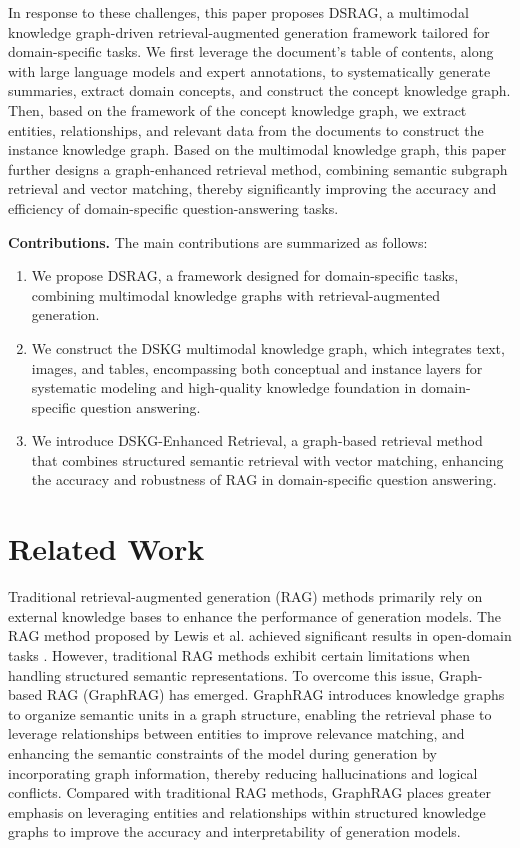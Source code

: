 \documentclass[runningheads]{llncs}
\begin{document}
	In response to these challenges, this paper proposes DSRAG, a multimodal knowledge graph-driven retrieval-augmented generation framework tailored for domain-specific tasks. We first leverage the document’s table of contents, along with large language models and expert annotations, to systematically generate summaries, extract domain concepts, and construct the concept knowledge graph. Then, based on the framework of the concept knowledge graph, we extract entities, relationships, and relevant data from the documents to construct the instance knowledge graph. Based on the multimodal knowledge graph, this paper further designs a graph-enhanced retrieval method, combining semantic subgraph retrieval and vector matching, thereby significantly improving the accuracy and efficiency of domain-specific question-answering tasks. 

\bigskip
\noindent\textbf{Contributions.} The main contributions are summarized as follows:

\begin{enumerate}
    \item We propose DSRAG, a framework designed for domain-specific tasks, combining multimodal knowledge graphs with retrieval-augmented generation.

    \item We construct the DSKG multimodal knowledge graph, which integrates text, images, and tables, encompassing both conceptual and instance layers for systematic modeling and high-quality knowledge foundation in domain-specific question answering.

    \item We introduce DSKG-Enhanced Retrieval, a graph-based retrieval method that combines structured semantic retrieval with vector matching, enhancing the accuracy and robustness of RAG in domain-specific question answering.
\end{enumerate}


    	\section{Related Work}\label{Work2}
	Traditional retrieval-augmented generation (RAG) methods primarily rely on external knowledge bases to enhance the performance of generation models. The RAG method proposed by Lewis et al. achieved significant results in open-domain tasks \cite{lewis2020retrieval}. However, traditional RAG methods exhibit certain limitations when handling structured semantic representations. To overcome this issue, Graph-based RAG (GraphRAG) has emerged. GraphRAG \cite{peng2024graph} introduces knowledge graphs to organize semantic units in a graph structure, enabling the retrieval phase to leverage relationships between entities to improve relevance matching, and enhancing the semantic constraints of the model during generation by incorporating graph information, thereby reducing hallucinations and logical conflicts. Compared with traditional RAG methods, GraphRAG places greater emphasis on leveraging entities and relationships within structured knowledge graphs to improve the accuracy and interpretability of generation models.
    
\end{document}

